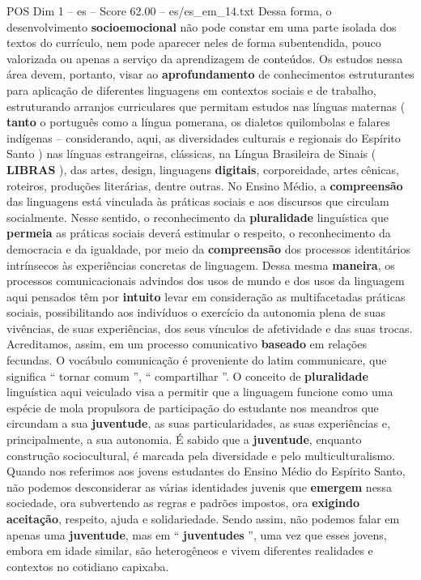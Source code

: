 \begin{textsample}{POS Dim 1 – es – Score 62.00 – es/es\_em\_14.txt}
Dessa forma, o desenvolvimento \textbf{socioemocional} não pode constar em uma parte isolada dos textos do currículo, nem pode aparecer neles de forma subentendida, pouco valorizada ou apenas a serviço da aprendizagem de conteúdos.
Os estudos nessa área devem, portanto, visar ao \textbf{aprofundamento} de conhecimentos estruturantes para aplicação de diferentes linguagens em contextos sociais e de trabalho, estruturando arranjos curriculares que permitam estudos nas línguas maternas ( \textbf{tanto} o português como a língua pomerana, os dialetos quilombolas e falares indígenas – considerando, aqui, as diversidades culturais e regionais do Espírito Santo ) nas línguas estrangeiras, clássicas, na Língua Brasileira de Sinais ( \textbf{LIBRAS} ), das artes, design, linguagens \textbf{digitais}, corporeidade, artes cênicas, roteiros, produções literárias, dentre outras.
No Ensino Médio, a \textbf{compreensão} das linguagens está vinculada às práticas sociais e aos discursos que circulam socialmente.
Nesse sentido, o reconhecimento da \textbf{pluralidade} linguística que \textbf{permeia} as práticas sociais deverá estimular o respeito, o reconhecimento da democracia e da igualdade, por meio da \textbf{compreensão} dos processos identitários intrínsecos às experiências concretas de linguagem.
Dessa mesma \textbf{maneira}, os processos comunicacionais advindos dos usos de mundo e dos usos da linguagem aqui pensados têm por \textbf{intuito} levar em consideração as multifacetadas práticas sociais, possibilitando aos indivíduos o exercício da autonomia plena de suas vivências, de suas experiências, dos seus vínculos de afetividade e das suas trocas.
Acreditamos, assim, em um processo comunicativo \textbf{baseado} em relações fecundas.
O vocábulo comunicação é proveniente do latim communicare, que significa “ tornar comum ”, “ compartilhar ”.
O conceito de \textbf{pluralidade} linguística aqui veiculado visa a permitir que a linguagem funcione como uma espécie de mola propulsora de participação do estudante nos meandros que circundam a sua \textbf{juventude}, as suas particularidades, as suas experiências e, principalmente, a sua autonomia.
É sabido que a \textbf{juventude}, enquanto construção sociocultural, é marcada pela diversidade e pelo multiculturalismo.
Quando nos referimos aos jovens estudantes do Ensino Médio do Espírito Santo, não podemos desconsiderar as várias identidades juvenis que \textbf{emergem} nessa sociedade, ora subvertendo as regras e padrões impostos, ora \textbf{exigindo} \textbf{aceitação}, respeito, ajuda e solidariedade.
Sendo assim, não podemos falar em apenas uma \textbf{juventude}, mas em “ \textbf{juventudes} ”, uma vez que esses jovens, embora em idade similar, são heterogêneos e vivem diferentes realidades e contextos no cotidiano capixaba.

\end{textsample}
